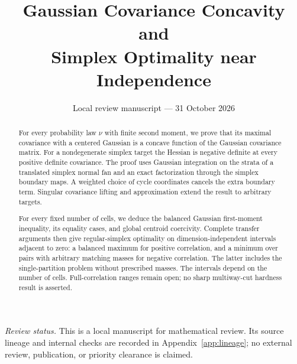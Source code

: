 \documentclass[11pt]{article}
\title{Gaussian Covariance Concavity and\\ Simplex Optimality near Independence}
\author{}
\date{Local review manuscript --- 31 October 2026}
\theoremstyle{definition}\newtheorem{definition}[theorem]{Definition}
\theoremstyle{remark}\newtheorem{remark}[theorem]{Remark}
\newcommand{\1}{\mathbf 1}
\begin{document}
\maketitle
\begin{abstract}
For every probability law $\nu$ with finite second moment, we prove that its
maximal covariance with a centered Gaussian is a concave function of the
Gaussian covariance matrix. For a nondegenerate simplex target the Hessian
is negative definite at every positive definite covariance. The proof uses
Gaussian integration on the strata of a translated simplex normal fan and an
exact factorization through the simplex boundary maps. A weighted choice of
cycle coordinates cancels the extra boundary term. Singular covariance lifting
and approximation extend the result to arbitrary targets.

For every fixed number of cells, we deduce the balanced Gaussian first-moment
inequality, its equality cases, and global centroid coercivity. Complete
transfer arguments then give regular-simplex optimality on dimension-independent
intervals adjacent to zero: a balanced maximum for positive correlation, and
a minimum over pairs with arbitrary matching masses for negative correlation.
The latter includes the single-partition problem without prescribed masses.
The intervals depend on the number of cells. Full-correlation ranges remain
open; no sharp multiway-cut hardness result is asserted.
\end{abstract}
\noindent\textit{Review status.}
This is a local manuscript for mathematical review. Its source lineage and
internal checks are recorded in Appendix~\ref{app:lineage}; no external review,
publication, or priority clearance is claimed.
\tableofcontents




\appendix





\end{document}
